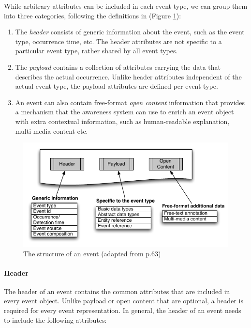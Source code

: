 While arbitrary attributes can be included in each event type, we can group them into three categories, following the definitions in \cite{Etzion2010} (Figure \ref{fig:event_structure}):

\begin{enumerate}
	\item The \emph{header} consists of generic information about the event, such as the event type, occurrence time, etc. The header attributes are not specific to a particular event type, rather shared by all event types.
	\item The \emph{payload} contains a collection of attributes carrying the data that describes the actual occurrence. Unlike header attributes independent of the actual event type, the payload attributes are defined per event type. 
	\item An event can also contain free-format \emph{open content} information that provides a mechanism that the awareness system can use to enrich an event object with extra contextual information, such as human-readable explanation, multi-media content etc.
\end{enumerate}

\begin{figure}[htbp] %
   \centering
   \includegraphics{event_structure.pdf} 
   \caption{The structure of an event (adapted from \cite{Etzion2010} p.63)}
   \label{fig:event_structure}
\end{figure}

\paragraph*{Header} %
\label{par:header}
The header of an event contains the common attributes that are included in every event object. Unlike payload or open content that are optional, a header is required for every event representation. In general, the header of an event needs to include the following attributes:

